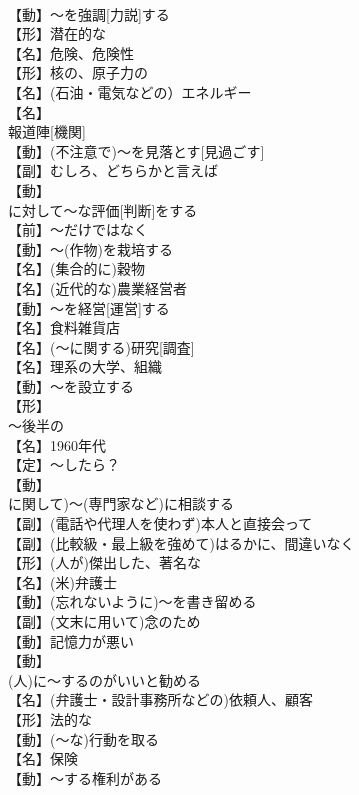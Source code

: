 \documentclass[8pt]{extreport}
\begin{document}
\begin{CJK}{UTF8}{min}
\\	【動】～を強調[力説]する
\\	【形】潜在的な
\\	【名】危険、危険性
\\	【形】核の、原子力の
\\	【名】(石油・電気などの）エネルギー
\\	【名】
\\	報道陣[機関]
\\	【動】(不注意で)～を見落とす[見過ごす]
\\	【副】むしろ、どちらかと言えば
\\	【動】
\\	に対して～な評価[判断]をする
\\	【前】～だけではなく
\\	【動】～(作物)を栽培する
\\	【名】(集合的に)穀物
\\	【名】(近代的な)農業経営者
\\	【動】～を経営[運営]する
\\	【名】食料雑貨店
\\	【名】(～に関する)研究[調査]
\\	【名】理系の大学、組織
\\	【動】～を設立する
\\	【形】
\\	～後半の
\\	【名】1960年代
\\	【定】～したら？
\\	【動】
\\	に関して)～(専門家など)に相談する
\\	【副】(電話や代理人を使わず)本人と直接会って
\\	【副】(比較級・最上級を強めて)はるかに、間違いなく
\\	【形】(人が)傑出した、著名な
\\	【名】(米)弁護士
\\	【動】(忘れないように)～を書き留める
\\	【副】(文末に用いて)念のため
\\	【動】記憶力が悪い
\\	【動】
\\	(人)に～するのがいいと勧める
\\	【名】(弁護士・設計事務所などの)依頼人、顧客
\\	【形】法的な
\\	【動】(～な)行動を取る
\\	【名】保険
\\	【動】～する権利がある

\end{CJK}
\end{document}
